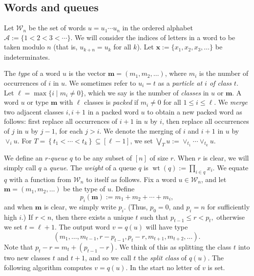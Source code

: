 \documentclass[reqno]{amsart}
\newcommand{\0}{\phantom{c}}
\newcommand{\merge}[1]{\vee_{#1}} %
\DeclareMathOperator{\wt}{wt} %
\newcommand{\xx}{\mathbf{x}}
\newcommand{\mm}{\mathbf{m}}
\newcommand{\mcA}{\mathcal{A}}
\newcommand{\mcW}{\mathcal{W}}
\let\prodnonlimits\prod
\renewcommand{\prod}{\prodnonlimits\limits}
\newcommand{\set}[1]{\left\{ #1 \right\}}
\newcommand{\ive}[1]{\left[ #1 \right]}
\newcommand{\defn}[1]{{\color{darkred}\emph{#1}}} %
\theoremstyle{plain}
\theoremstyle{definition}
\numberwithin{equation}{section}
\begin{document}
\subsection{Words and queues}

Let $\mcW_n$ be the set of words $u = u_1 \dotsm u_n$ in the ordered alphabet $\mcA := \{1 < 2 < 3 < \cdots \}$.
We will consider the indices of letters in a word to be taken modulo $n$ (that is, $u_{k+n} = u_k$ for all $k$).
Let $\xx := \{x_1, x_2, x_3, \ldots\}$ be indeterminates.

The \defn{type} of a word $u$ is the vector $\mm = (m_1, m_2, \ldots)$, where $m_i$ is the number of occurrences of $i$ in $u$.
We sometimes refer to $u_i = t$ as a \defn{particle at $i$ of class $t$}.
Let $\ell = \max\{i \mid m_i \neq 0 \}$, which we say is the number of \defn{classes} in $u$ or $\mm$.
A word $u$ or type $\mm$ with $\ell$ classes is \defn{packed} if $m_i \neq 0$ for all $1 \leq i \leq \ell$.
We \defn{merge} two adjacent classes $i,i+1$ in a packed word $u$ to obtain a new packed word as follows: first replace all occurrences of $i+1$ in $u$ by $i$, then replace all occurrences of $j$ in $u$ by $j-1$, for each $j > i$.
We denote the merging of $i$ and $i+1$ in $u$ by $\merge{i} u$.
For $T = \set{t_1 < \cdots < t_k} \subseteq \ive{\ell-1}$, we set $\bigvee_T u := \merge{t_1} \cdots \merge{t_k} u$.

We define an \defn{$r$-queue} $q$ to be any subset of $\ive{n}$ of size $r$. When $r$ is clear, we will simply call $q$ a \defn{queue}.
The \defn{weight} of a queue $q$ is $\wt(q) := \prod_{i \in q} x_i$.
We equate $q$ with a function from $\mcW_n$ to itself as follows.
Fix a word $u \in \mcW_n$, and let $\mm = (m_1, m_2, \ldots)$ be the type of $u$.
Define
\begin{equation}
\label{eq:type_partial_sums}
p_i(\mm) := m_1 + m_2 + \cdots + m_i,
\end{equation}
and when $\mm$ is clear, we simply write $p_i$.
(Thus, $p_0 = 0$, and $p_i = n$ for sufficiently high $i$.)
If $r < n$, then there exists a unique $t$ such that
$
p_{t-1} \leq r < p_t,
$
otherwise we set $t = \ell + 1$.
The output word $v = q(u)$ will have type
\[
(m_1, \dots, m_{t-1}, r-p_{t-1}, p_{t}-r, m_{t+1}, m_{t+2}, \ldots).
\]
Note that $p_{t} - r = m_{t} + (p_{t-1} - r)$.
We think of this as splitting the class $t$ into two new classes $t$ and $t+1$, and so we call $t$ the \defn{split class} of $q(u)$.
The following algorithm computes $v = q(u)$. In the start no letter of $v$ is set.
\end{document}
